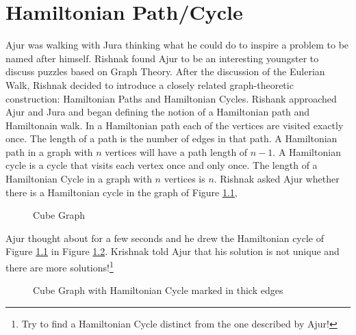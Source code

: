 \chapter{Hamiltonian Path/Cycle}
Ajur was walking with Jura thinking what he could do to inspire a problem to be named after himself. Rishnak found Ajur to be an interesting youngster to discuss puzzles based on Graph Theory. After the discussion of the Eulerian Walk, Rishnak decided to introduce a closely related graph-theoretic construction: Hamiltonian Paths and Hamiltonian Cycles. Rishank approached Ajur and Jura and began defining the notion of a Hamiltonian path and Hamiltonain walk.
In a Hamiltonian path each of the vertices are visited exactly once. 
The length of a path is the number of edges in that path. A Hamiltonian path in a graph with $n$ vertices will have a path length of $n-1$. A Hamiltonian cycle is a cycle that visits each vertex once and only once. The length of a Hamiltonian Cycle in a graph with $n$ vertices is $n$. Rishnak asked Ajur whether there is a Hamiltonian cycle in the graph of Figure \ref{5g1},
\begin{figure}
\begin{center}
\caption{ Cube Graph }\label{5g1}
\end{center}
\end{figure}

Ajur thought about for a few seconds and he drew the Hamiltonian cycle of Figure \ref{5g1} in Figure \ref {5g2}. Krishnak told Ajur that his solution is not unique and there are more solutions!\footnote{Try to find a Hamiltonian Cycle distinct from the one described by Ajur!}

\begin{figure}
\begin{center}
\caption{ Cube Graph with Hamiltonian  Cycle marked in thick edges}\label{5g2}
\end{center}
\end{figure}


